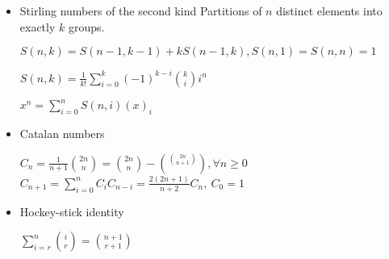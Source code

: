 \begin{itemize}
\item Stirling numbers of the second kind
Partitions of $n$ distinct elements into exactly $k$ groups. 

$S(n, k) = S(n - 1, k - 1) + kS(n - 1, k), S(n, 1) = S(n, n) = 1$

$S(n, k) = \frac{1}{k!}\sum_{i=0}^{k}(-1)^{k-i}{k \choose i}i^n$

$x^n     = \sum_{i=0}^{n} S(n, i) (x)_i$

\item Catalan numbers

$C_n = \frac{1}{n+1}{2n \choose n} = {2n \choose n}-\binom{2n \choose n+1}\ , \forall n \geq 0 $
$C_{n+1} = \sum_{i=0}^{n} C_iC_{n-i} = \frac{2(2n+1)}{n+2}C_n,\ C_0 = 1$

\item Hockey-stick identity

$\sum_{i = r}^{n} {i \choose r} = {n + 1 \choose r + 1}$

\end{itemize}
